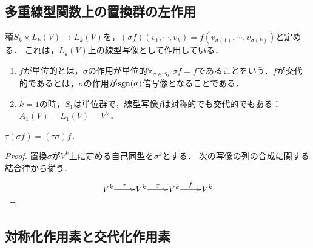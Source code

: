 \documentclass[uplatex,dvipdfmx]{jsreport}
\begin{document}
\subsection{多重線型関数上の置換群の左作用}

\begin{definition}
    積$S_k\times L_k(V)\to L_k(V)$を，$(\sigma f)(v_1,\cdots,v_k)=f(v_{\sigma(1)},\cdots,v_{\sigma(k)})$と定める．
    これは，$L_k(V)$上の線型写像として作用している．
\end{definition}
\begin{example}\label{example-characterization-of-alternizingness}\mbox{}
    \begin{enumerate}
        \item $f$が単位的とは，$\sigma$の作用が単位的$\forall_{\sigma\in S_k}\;\sigma f=f$であることをいう．$f$が交代的であるとは，$\sigma$の作用が$\mathrm{sgn}(\sigma)$倍写像となることである．
        \item $k=1$の時，$S_1$は単位群で，線型写像$f$は対称的でも交代的でもある：$A_1(V)=L_1(V)=V^\vee$．
    \end{enumerate}
\end{example}

\begin{lemma}[群作用である]
    $\tau(\sigma f)=(\tau\sigma)f$．
\end{lemma}
\begin{proof}
    置換$\sigma$が$V^k$上に定める自己同型を$\sigma^k$とする．
    次の写像の列の合成に関する結合律から従う．
    \[\xymatrix@1{
        V^k\ar[r]^-\tau&V^k\ar[r]^-\sigma&V^k\ar[r]^-f&V^k
    }\]
\end{proof}

\subsection{対称化作用素と交代化作用素}
\end{document}

